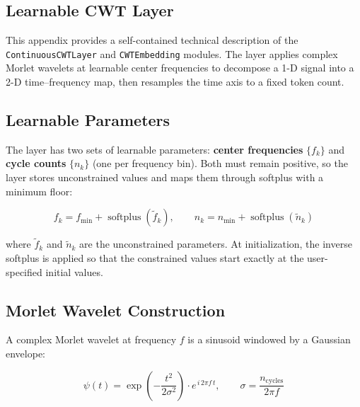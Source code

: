 \documentclass[11pt, a4paper]{article}
\begin{document}
\begin{appendices}

      \section{Learnable CWT Layer}
      \label{app:cwt}

      This appendix provides a self-contained technical description of the
      \texttt{ContinuousCWTLayer} and \texttt{CWTEmbedding} modules. The
      layer applies complex Morlet wavelets at learnable center frequencies
      to decompose a 1-D signal into a 2-D time--frequency map, then
      resamples the time axis to a fixed token count.

      \subsection{Learnable Parameters}

      The layer has two sets of learnable parameters: \textbf{center
            frequencies} $\{f_k\}$ and \textbf{cycle counts} $\{n_k\}$ (one per
      frequency bin). Both must remain positive, so the layer stores
      unconstrained values and maps them through softplus with a minimum
      floor:

      \begin{equation}
            f_k = f_\text{min} + \operatorname{softplus}(\tilde{f}_k), \qquad
            n_k = n_\text{min} + \operatorname{softplus}(\tilde{n}_k)
      \end{equation}

      where $\tilde{f}_k$ and $\tilde{n}_k$ are the unconstrained parameters.
      At initialization, the inverse softplus is applied so that the
      constrained values start exactly at the user-specified initial values.

      \subsection{Morlet Wavelet Construction}

      A complex Morlet wavelet at frequency $f$ is a sinusoid windowed by a
      Gaussian envelope:

      \begin{equation}
            \psi(t) = \exp\!\left(-\frac{t^2}{2\sigma^2}\right) \cdot
            e^{\,i\,2\pi f\, t}, \qquad
            \sigma = \frac{n_\text{cycles}}{2\pi f}
      \end{equation}


\end{appendices}
\end{document}
